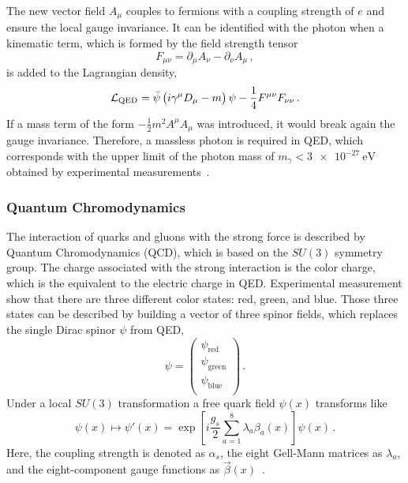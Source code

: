 The new vector field $A_\mu$ couples to fermions with a coupling strength of $e$ and ensure the local gauge invariance.
It can be identified with the photon when a kinematic term, which is formed by the field strength tensor
\begin{equation}
    F_{\mu \nu} = \partial_\mu A_\nu - \partial_\nu A_\mu \,,
\end{equation}
is added to the Lagrangian density,
\begin{equation}
    \mathcal{L}_\text{QED} = \bar{\psi} \left( i \gamma^\mu D_\mu -m \right) \psi - \frac{1}{4} F^{\mu\nu} F_{\nu\nu} \,.
\end{equation}
If a mass term of the form $-\frac{1}{2}m^2 A^\mu A_\mu $ was introduced, it would break again the gauge invariance.
Therefore, a massless photon is required in QED, which corresponds with the upper limit of the photon mass of $m_\gamma < \SI{3e-27}{\eV}$
obtained by experimental measurements~\cite{PhotonMass}.

\subsubsection{Quantum Chromodynamics}

The interaction of quarks and gluons with the strong force is described by Quantum Chromodynamics (QCD), which is based on the $SU(3)$ symmetry group.
The charge associated with the strong interaction is the color charge, which is the equivalent to the electric charge in QED\@.
Experimental measurement show that there are three different color states: red, green, and blue.
Those three states can be described by building a vector of three spinor fields, which replaces the single Dirac spinor $\psi$ from QED,
\begin{equation}
    \psi =
    \begin{pmatrix}
        \psi_\text{red} \\
        \psi_\text{green} \\
        \psi_\text{blue} \\
    \end{pmatrix} \,.
\end{equation}
Under a local $SU(3)$ transformation a free quark field $\psi(x)$ transforms like
\begin{equation}
    \psi(x) \mapsto \psi'(x) = \exp \left[ i \frac{g_s}{2} \sum_{a=1}^8 \lambda_a \beta_a (x) \right] \psi(x) \,.
\end{equation}
Here, the coupling strength is denoted as $\alpha_s$, the eight Gell-Mann matrices as $\lambda_a$, and the eight-component gauge functions as $\vec{\beta}(x)$~\cite{Schmuser}.

